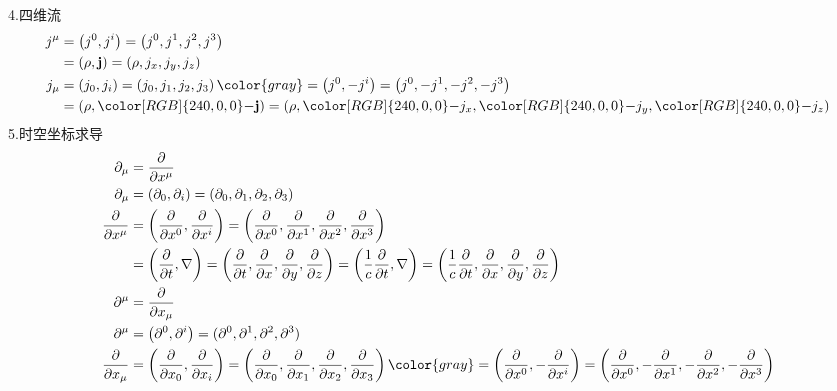 4.四维流
\begin{equation}
    \begin{aligned}
        j^{\mu}&=\left( j^0,j^i \right) =\left( j^0,j^1,j^2,j^3 \right) 
\\
&=\left( \rho ,\mathbf{j} \right) =\left( \rho ,j_x,j_y,j_z \right) 
\\
j_{\mu}&=\left( j_0,j_i \right) =\left( j_0,j_1,j_2,j_3 \right) {\color{gray} =\left( j^0,-j^i \right) =\left( j^0,-j^1,-j^2,-j^3 \right) }
\\
&=\left( \rho ,{\color[RGB]{240, 0, 0} -}\mathbf{j} \right) =\left( \rho ,{\color[RGB]{240, 0, 0} -}j_x,{\color[RGB]{240, 0, 0} -}j_y,{\color[RGB]{240, 0, 0} -}j_z \right) 
    \end{aligned}
\end{equation}
5.时空坐标求导
\begin{equation}
    \begin{aligned}
        \partial _{\mu}&=\frac{\partial}{\partial x^{\mu}}
\\
\partial _{\mu}&=\left( \partial _0,\partial _i \right) =\left( \partial _0,\partial _1,\partial _2,\partial _3 \right) 
\\
\frac{\partial}{\partial x^{\mu}}&=\left( \frac{\partial}{\partial x^0},\frac{\partial}{\partial x^i} \right) =\left( \frac{\partial}{\partial x^0},\frac{\partial}{\partial x^1},\frac{\partial}{\partial x^2},\frac{\partial}{\partial x^3} \right) 
\\
&=\left( \frac{\partial}{\partial t},\nabla \right) =\left( \frac{\partial}{\partial t},\frac{\partial}{\partial x},\frac{\partial}{\partial y},\frac{\partial}{\partial z} \right) =\left( \frac{1}{c}\frac{\partial}{\partial t},\nabla \right) =\left( \frac{1}{c}\frac{\partial}{\partial t},\frac{\partial}{\partial x},\frac{\partial}{\partial y},\frac{\partial}{\partial z} \right) 
\\
\partial ^{\mu}&=\frac{\partial}{\partial x_{\mu}}
\\
\partial ^{\mu}&=\left( \partial ^0,\partial ^i \right) =(\partial ^0,\partial ^1,\partial ^2,\partial ^3)
\\
\frac{\partial}{\partial x_{\mu}}&=\left( \frac{\partial}{\partial x_0},\frac{\partial}{\partial x_i} \right) =\left( \frac{\partial}{\partial x_0},\frac{\partial}{\partial x_1},\frac{\partial}{\partial x_2},\frac{\partial}{\partial x_3} \right) {\color{gray} =\left( \frac{\partial}{\partial x^0},-\frac{\partial}{\partial x^i} \right) =\left( \frac{\partial}{\partial x^0},-\frac{\partial}{\partial x^1},-\frac{\partial}{\partial x^2},-\frac{\partial}{\partial x^3} \right) }

\end{aligned}
\end{equation}
